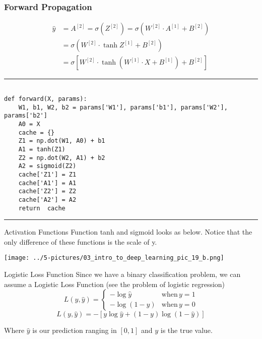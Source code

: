 \documentclass[11pt]{beamer}
\newcommand{\highlight}[1]{%
  \colorbox{yellow!100}{$\displaystyle#1$}}
\begin{document}
\begin{frame}[fragile]
\frametitle{Forward Propagation}
\scriptsize

\begin{align*}
\hat y &= A^{[2]} = \sigma\left(Z^{[2]}\right) = \sigma \left( W^{[2]} \cdot A^{[1]} + B^{[2]} \right) \\
&= \sigma \left( W^{[2]} \cdot \tanh{Z^{[1]}} + B^{[2]} \right) \\
&= \sigma \left[ W^{[2]} \cdot \tanh\left( W^{[1]} \cdot X + B^{[1]} \right) + B^{[2]} \right]
\end{align*}

\rule{\textwidth}{1pt}
\begin{verbatim}

def forward(X, params):
    W1, b1, W2, b2 = params['W1'], params['b1'], params['W2'], params['b2']
    A0 = X
    cache = {}
    Z1 = np.dot(W1, A0) + b1
    A1 = tanh(Z1)
    Z2 = np.dot(W2, A1) + b2
    A2 = sigmoid(Z2)
    cache['Z1'] = Z1
    cache['A1'] = A1
    cache['Z2'] = Z2
    cache['A2'] = A2
    return  cache

\end{verbatim}
\rule{\textwidth}{1pt}
\end{frame}
\begin{frame}{Activation Functions}
Function tanh and sigmoid looks as below. Notice that the only difference of these functions is the scale of y.
	\begin{center}
	\texttt{[image: ../5-pictures/03\_intro\_to\_deep\_learning\_pic\_19\_b.png]}
	\end{center}
\end{frame}
\begin{frame}{Logistic Loss Function}
Since we have a binary classification problem, we can assume a Logistic Loss Function (see the problem of logistic regression)
\begin{equation}
L(y, \hat{y}) = 
\begin{cases} 
-\log{\hat{y}} & \text{when}\, y = 1 \\ -\log(1 - \hat{y}) & \text{when}\, y = 0 
\end{cases} 
\end{equation}
$$ L(y, \hat{y}) = -[y\log{\hat{y}} + (1 - y)\log{(1 - \hat{y})}] $$

Where $\hat y$ is our \highlight{\text{prediction}} ranging in $[0, 1]$ and $y$ is the \highlight{\text{true}} value. 

\end{frame}
\end{document}
